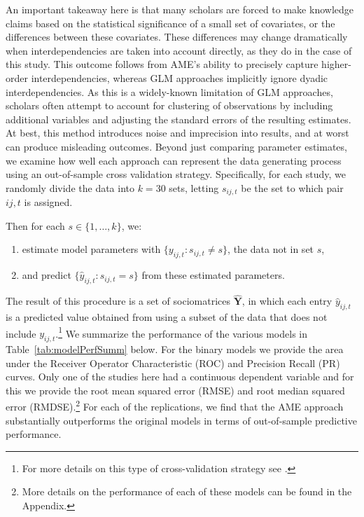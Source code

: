 \documentclass{article}[12pt]
\begin{document}
An important takeaway here is that %
many scholars are forced to make knowledge claims based on the statistical significance of a small set of covariates, or
the differences between these covariates.  These differences may
change dramatically when interdependencies are taken into account
directly, as they do in the case of this study. %
This outcome follows from AME's ability to precisely capture higher-order
interdependencies, whereas GLM approaches implicitly ignore dyadic
interdependencies. As this is a widely-known limitation of GLM
approaches, scholars often attempt to account for clustering of
observations by including additional variables and adjusting the
standard errors of the resulting estimates. At best, this method
introduces noise and imprecision into results, and at worst can
produce misleading outcomes.   Beyond just comparing parameter
estimates, we examine how well each approach can represent the data
generating process using an out-of-sample cross validation
strategy. Specifically, for each study, we randomly divide the data
into $k=30$ sets, letting $s_{ij,t}$ be the set to which pair $ij,t$
is assigned.

Then for each $s \in \{1,\ldots,k\}$, we:

\begin{enumerate}
	\item estimate model parameters with $\{y_{ij,t}: s_{ij,t} \neq s\}$, the data not in set $s$,
	\item and predict $\{\hat{y}_{ij,t}: s_{ij,t} = s\}$ from these estimated parameters. 
\end{enumerate}

\noindent The result of this procedure is a set of sociomatrices $\bm \hat Y$, in which each entry $\hat y_{ij,t}$ is a predicted value obtained from using a subset of the data that does not include $y_{ij,t}$.\footnote{For more details on this type of cross-validation strategy see \citet{minhas:etal:2016:arxiv}.} We summarize the performance of the various models in Table~\ref{tab:modelPerfSumm} below. For the binary models we  provide the area under the Receiver Operator Characteristic (ROC) and Precision Recall (PR) curves. Only one of the studies here had a continuous dependent variable and for this we provide the root mean squared error (RMSE) and root median squared error (RMDSE).\footnote{More details on the performance of each of these models can be found in the Appendix.} For each of the replications, we find that the AME approach substantially outperforms the original models in terms of out-of-sample predictive performance.
\end{document}

